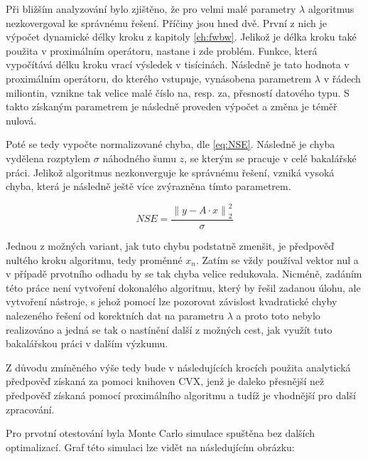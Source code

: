 \documentclass[FM,BP]{tulthesis}
\newcounter{Vzorce}
\begin{document}
Při bližším analyzování bylo zjištěno, že pro velmi malé parametry $\lambda$ algoritmus nezkovergoval ke správnému řešení. Příčiny jsou hned dvě. První z nich je výpočet dynamické délky kroku z kapitoly \ref{ch:fwbw}. Jelikož je délka kroku také použita v proximálním operátoru, nastane i zde problém. Funkce, která vypočítává délku kroku vrací výsledek v tisícinách. Následně je tato hodnota v proximálním operátoru, do kterého vstupuje, vynásobena parametrem $\lambda$ v řádech miliontin, vznikne tak velice malé číslo na, resp. za, přesností datového typu. S takto získaným parametrem je následně proveden výpočet a změna je téměř nulová.

Poté se tedy vypočte normalizované chyba, dle \ref{eq:NSE}. Následně je chyba vydělena rozptylem $\sigma$ náhodného šumu $z$, se kterým se pracuje v celé bakalářské práci. Jelikož algoritmus nezkonverguje ke správnému řešení, vzniká vysoká chyba, která je následně ještě více zvýrazněna tímto parametrem.

\begin{equation} \label{eq:NSE}  \tag{Vzorec \theVzorce}
NSE = \frac{\left\| y - A \cdot x\right\|_{2}^{2} }{\sigma}
\end{equation}

Jednou z možných variant, jak tuto chybu podstatně zmenšit, je předpověď nultého kroku algoritmu, tedy proměnné $x_{n}$. Zatím se vždy používal vektor nul a v případě prvotního odhadu by se tak chyba velice redukovala. Nicméně, zadáním této práce není vytvoření dokonalého algoritmu, který by řešil zadanou úlohu, ale vytvoření nástroje, s jehož pomocí lze pozorovat závislost kvadratické chyby nalezeného řešení od korektních dat na parametru $\lambda$ a proto toto nebylo realizováno a jedná se tak o nastínění další z možných cest, jak využít tuto bakalářskou práci v dalším výzkumu.

Z důvodu zmíněného výše tedy bude v následujících krocích použita analytická předpověď získaná za pomoci knihoven CVX, jenž je daleko přesnější než předpověď získaná pomocí proximálního algoritmu a tudíž je vhodnější pro další zpracování. 

Pro prvotní otestování byla Monte Carlo simulace spuštěna bez dalších optimalizací. Graf této simulaci lze vidět na následujícím obrázku:
\end{document}
